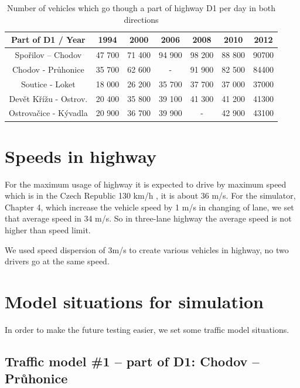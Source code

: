 \begin{table}[ph]
\begin{centering}
\begin{tabular}{|c|c|c|c|c|c|c|}
\hline 
Part of D1 / Year & 1994 & 2000 & 2006 & 2008 & 2010 &  2012\tabularnewline
\hline 
Spořilov – Chodov & 47 700 &	71 400 &	94 900 &	98 200 &	88 800 &	90700\tabularnewline
\hline 
Chodov - Průhonice &	35 700 &	62 600 &	- &	91 900 &	82 500 &	84400\tabularnewline
\hline 
Soutice - Loket &	18 000 &	26 200 &	35 700 &	37 700 &	37 000 &	37000\tabularnewline
\hline 
Devět Křížu - Ostrov. &	20 400 &	35 800 &	39 100 &	41 300 &	41 200 &	41300\tabularnewline
\hline 
Ostrovačice - Kývadla &	20 900 &	36 700 &	39 900 &	- &	42 900 &	43100\tabularnewline
\hline 
\end{tabular}
\centering
\protect\caption{\label{tab:2_3-1}Number of vehicles which go though a part of highway D1 per day in both directions}
\end{centering}
\end{table}











\section{Speeds in highway}

For the maximum usage of highway it is expected to drive by maximum speed which is in the Czech Republic 130 km/h , it is about 36 m/s. For the simulator, Chapter 4, which increase the vehicle speed by 1 m/s in changing of lane, we set that average speed in 34 m/s. So in three-lane highway the average speed is not higher than speed limit.

We used speed dispersion of 3m/s to create various vehicles in highway, no two drivers go at the same speed.







\section{Model situations for simulation}

In order to make the future testing easier, we set some traffic model situations.


\subsection*{Traffic model \#1 – part of D1: Chodov – Průhonice}

